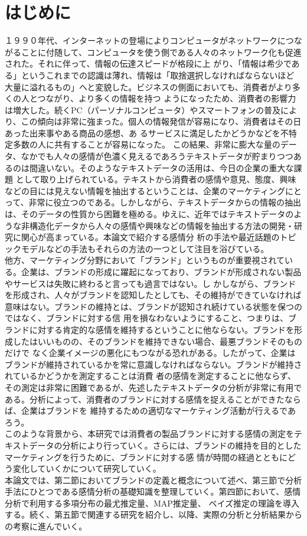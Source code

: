 \documentclass[uplatex,11pt]{jsarticle}
\begin{document}
\section{はじめに}
１９９０年代、インターネットの登場によりコンピュータがネットワークにつながることに付随して、コンピュータを使う側である人々のネットワーク化も促進された。それに伴って、情報の伝達スピードが格段に上
がり、「情報は希少である」というこれまでの認識は薄れ、情報は「取捨選択しなければならないほど大量に溢れるもの」へと変貌した。ビジネスの側面においても、消費者がより多くの人とつながり、より多くの情報を持つ
ようになったため、消費者の影響力は増大した。続くPC（パーソナルコンピュータ）やスマートフォンの普及により、この傾向は非常に強まった。個人の情報発信が容易になり、消費者はその日あった出来事やある商品の感想、あ
るサービスに満足したかどうかなどを不特定多数の人に共有することが容易になった。
この結果、非常に膨大な量のデータ、なかでも人々の感情が色濃く見えるであろうテキストデータが貯まりつつあるのは間違いない。そのようなテキストデータの活用は、今日の企業の重大な課題
として取り上げられている。テキストから消費者の感情や意見、態度、興味などの目には見えない情報を抽出するということは、企業のマーケティングにとって、非常に役立つのである。しかしながら、テキストデータからの情報の抽出
は、そのデータの性質から困難を極める。ゆえに、近年ではテキストデータのような非構造化データから人々の感情や興味などの情報を抽出する方法の開発・研究に関心が高まっている。本論文で紹介する感情分
析の手法や最近話題のトピックモデルなどの手法もそれらの方法の一つとして注目を浴びている。\\
他方、マーケティング分野において「ブランド」というものが重要視されている。企業は、ブランドの形成に躍起になっており、ブランドが形成されない製品やサービスは失敗に終わると言っても過言ではない。し
かしながら、ブランドを形成され、人々がブランドを認知したとしても、その維持ができていなければ意味はない。ブランドの維持とは、ブランドが認知され続けている状態を保つのではなく、ブランドに対する信
用を損なわないようにすること、つまりは、ブランドに対する肯定的な感情を維持するということに他ならない。ブランドを形成したはいいものの、そのブランドを維持できない場合、最悪ブランドそのものだけで
なく企業イメージの悪化にもつながる恐れがある。したがって、企業はブランドが維持されているかを常に意識しなければならない。ブランドが維持されているかどうかを測定することは消費
者の感情を測定することに他ならず、その測定は非常に困難であるが、先述したテキストデータの分析が非常に有用である。分析によって、消費者のブランドに対する感情を捉えることができたならば、企業はブランドを
維持するための適切なマーケティング活動が行えるであろう。
\\このような背景から、本研究では消費者の製品ブランドに対する感情の測定をテキストデータの分析により行っていく。さらには、ブランドの維持を目的としたマーケティングを行うために、ブランドに対する感
情が時間の経過とともにどう変化していくかについて研究していく。
\\本論文では、第二節においてブランドの定義と概念について述べ、第三節で分析手法にひとつである感情分析の基礎知識を整理していく。第四節において、感情分析で利用する多項分布の最尤推定量、MAP推定量、
ベイズ推定の理論を導入する。続く、第五節で関連する研究を紹介し、以降、実際の分析と分析結果からの考察に進んでいく。
\end{document}
